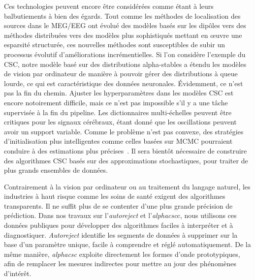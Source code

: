 Ces technologies peuvent encore être considérées comme étant à leurs balbutiements à bien des égards. Tout comme les méthodes de localisation des sources dans le MEG/EEG ont évolué des modèles basés sur les dipôles vers des méthodes distribuées vers des modèles plus sophistiqués mettant en œuvre une esparsité structurée, ces nouvelles méthodes sont susceptibles de subir un processus évolutif d'améliorations incrémentielles. Si l'on considère l'exemple du CSC, notre modèle basé sur des distributions alpha-stables a étendu les modèles de vision par ordinateur de manière à pouvoir gérer des distributions à queue lourde, ce qui est caractéristique des données neuronales. Évidemment, ce n'est pas la fin du chemin. Ajuster les hyperparamètres dans les modèles CSC est encore notoirement difficile, mais ce n'est pas impossible s'il y a une tâche supervisée à la fin du pipeline. Les dictionnaires multi-échelles peuvent être critiques pour les signaux cérébraux, étant donné que les oscillations peuvent avoir un support variable. Comme le problème n'est pas convexe, des stratégies d'initialisation plus intelligentes comme celles basées sur MCMC pourraient conduire à des estimations plus précises~\citep{bachem2016fast}. Il sera bientôt nécessaire de construire des algorithmes CSC basés sur des approximations stochastiques, pour traiter de plus grands ensembles de données.

Contrairement à la vision par ordinateur ou au traitement du langage naturel, les industries à haut risque comme les soins de santé exigent des algorithmes transparents. Il ne suffit plus de se contenter d'une plus grande précision de prédiction. Dans nos travaux sur l'\emph{autoreject} et l'\emph{alphacsc}c, nous utilisons ces données publiques pour développer des algorithmes faciles à interpréter et à diagnostiquer. \emph{Autoreject} identifie les segments de données à supprimer sur la base d'un paramètre unique, facile à comprendre et réglé automatiquement. De la même manière, \emph{alphacsc} exploite directement les formes d'onde prototypiques, afin de remplacer les mesures indirectes pour mettre au jour des phénomènes d'intérêt.

